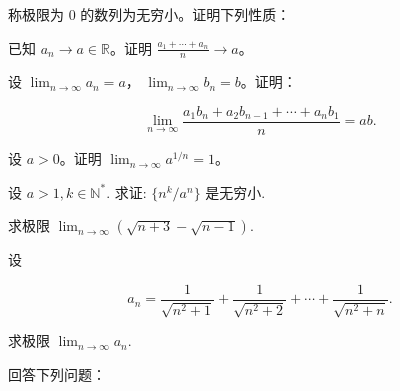\noindent\begin{minipage}{\textwidth}
称极限为 $0$ 的数列为无穷小。证明下列性质：
\end{minipage}\par\vfill
\noindent\begin{minipage}{\textwidth}
已知 $a_n\to a\in\mathbb R$。证明 $\displaystyle\frac{a_1+\cdots+a_n}{n}\to a$。
\end{minipage}\par\vfill
\newpage
\noindent\begin{minipage}{\textwidth}
设  $ \lim_{n\to\infty}a_n=a $， $ \lim_{n\to\infty}b_n=b $。证明：

\[\lim_{n\to\infty}\frac{a_1b_n+a_2b_{n-1}+\cdots+a_nb_1}{n}=ab.\]
\end{minipage}\par\vfill
\noindent\begin{minipage}{\textwidth}
设 $a>0$。证明 $\displaystyle\lim_{n\to\infty}a^{1/n}=1$。
\end{minipage}\par\vfill
\noindent\begin{minipage}{\textwidth}
设  $ a > 1, k \in \mathbb{N}^* $. 求证:  $ \{n^k / a^n\} $ 是无穷小.
\end{minipage}\par\vfill
\newpage
\noindent\begin{minipage}{\textwidth}
求极限  $ \lim_{n \to \infty} (\sqrt{n + 3} - \sqrt{n - 1}) $.
\end{minipage}\par\vfill
\noindent\begin{minipage}{\textwidth}
设

\[a_{n}=\frac{1}{\sqrt{n^{2}+1}}+\frac{1}{\sqrt{n^{2}+2}}+\cdots+\frac{1}{\sqrt{n^{2}+n}}.\]

求极限 $ \lim_{n\to\infty}a_n $.
\end{minipage}\par\vfill
\noindent\begin{minipage}{\textwidth}
回答下列问题：
\end{minipage}\par\vfill
